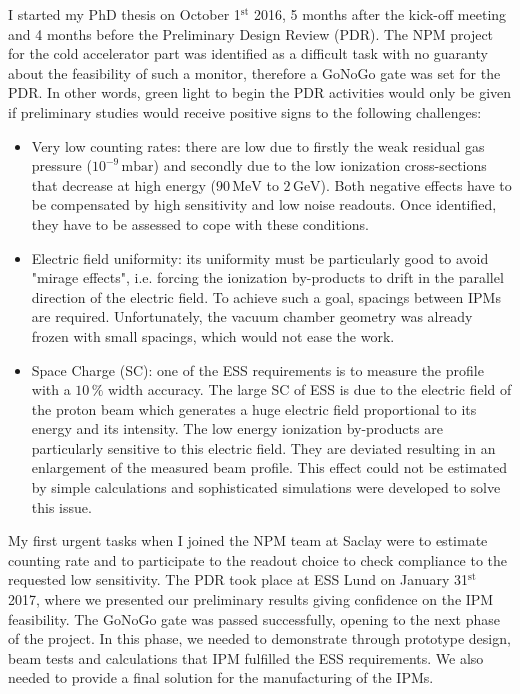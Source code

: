 I started my PhD thesis on October 1$\mathrm{^{st}}$ 2016, 5 months after the kick-off meeting and 4 months before the Preliminary Design Review (PDR). The NPM project for the cold accelerator part was identified as a difficult task with no guaranty about the feasibility of such a monitor, therefore a GoNoGo gate was set for the PDR. In other words, green light to begin the PDR activities would only be given if preliminary studies would receive positive signs to the following challenges:
\begin{itemize}
  \item Very low counting rates: there are low due to firstly the weak residual gas pressure ($10^{-9}\,\mathrm{mbar}$) and secondly due to the low ionization cross-sections that decrease at high energy ($90\,\mathrm{MeV}$ to $2\,\mathrm{GeV}$). Both negative effects have to be compensated by high sensitivity and low noise readouts. Once identified, they have to be assessed to cope with these conditions.
  \item Electric field uniformity: its uniformity must be particularly good to avoid "mirage effects", i.e. forcing the ionization by-products to drift in the parallel direction of the electric field. To achieve such a goal, spacings between IPMs are required. Unfortunately, the vacuum chamber geometry was already frozen with small spacings, which would not ease the work.
  \item Space Charge (SC): one of the ESS requirements is to measure the profile with a $10\,\%$ width accuracy. The large SC of ESS is due to the electric field of the proton beam which generates a huge electric field proportional to its energy and its intensity. The low energy ionization by-products are particularly sensitive to this electric field. They are deviated resulting in an enlargement of the measured beam profile. This effect could not be estimated by simple calculations and sophisticated simulations were developed to solve this issue.
\end{itemize}

My first urgent tasks when I joined the NPM team at Saclay were to estimate counting rate and to participate to the readout choice to check compliance to the requested low sensitivity. The PDR took place at ESS Lund on January 31$\mathrm{^{st}}$ 2017, where we presented our preliminary results giving confidence on the IPM feasibility. The GoNoGo gate was passed successfully, opening to the next phase of the project. In this phase, we needed to demonstrate through prototype design, beam tests and calculations that IPM fulfilled the ESS requirements. We also needed to provide a final solution for the manufacturing of the IPMs.


